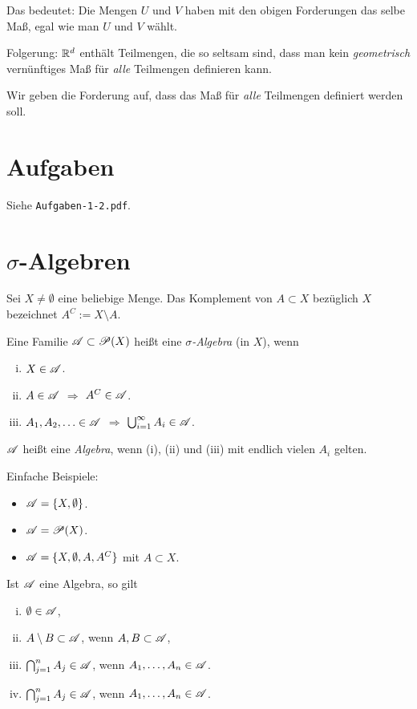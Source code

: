 Das bedeutet: Die Mengen $U$ und $V$ haben mit den obigen Forderungen das selbe Maß, egal wie man $U$ und $V$ wählt.

Folgerung: $\mathbb{R}^d$ enthält Teilmengen, die so seltsam sind, dass man kein \emph{geometrisch} vernünf\-tiges Maß für \emph{alle} Teilmengen definieren kann.

Wir geben die Forderung auf, dass das Maß für \emph{alle} Teilmengen definiert werden soll.

\section{Aufgaben}
 Siehe \verb+Aufgaben-1-2.pdf+.

\section{\texorpdfstring{$\sigma$}{Sigma}-Algebren}
Sei $X \ne \emptyset$ eine beliebige Menge. Das Komplement von $A \subset X$ bezüglich $X$ bezeichnet $A^C := X \setminus A$.

\begin{defn}
 Eine Familie $\mathscr{A} \subset \mathscr{P}(X)$ heißt eine \emph{$\sigma$-Algebra} (in $X$), wenn
 \begin{enumerate}[(i)]
  \item $X \in \mathscr{A}$.
  \item $A \in \mathscr{A}$ $\Rightarrow$ $A^C \in \mathscr{A}$.
  \item $A_1, A_2, \ldots \in \mathscr{A}$ $\Rightarrow$ $\bigcup_{i=1}^\infty A_i \in \mathscr{A}$.
 \end{enumerate}
 $\mathscr{A}$ heißt eine \emph{Algebra}, wenn (i), (ii) und (iii) mit endlich vielen $A_i$ gelten.
\end{defn}

Einfache Beispiele:
\begin{itemize}
 \item $\mathscr{A} = \{ X, \emptyset \}$.
 \item $\mathscr{A} = \mathscr{P}( X )$.
 \item $\mathscr{A} = \{ X, \emptyset, A, A^C \}$ mit $A \subset X$.
\end{itemize}

\clearpage

\begin{lem}
 Ist $\mathscr{A}$ eine Algebra, so gilt
 \begin{enumerate}[(i)]
  \item $\emptyset \in \mathscr{A}$,
  \item $A \setminus B \subset \mathscr{A}$, wenn $A,B \subset \mathscr{A}$,
  \item $\bigcap_{j=1}^n A_j \in \mathscr{A}$, wenn $A_1, \ldots, A_n \in \mathscr{A}$.
  \item $\bigcap_{j=1}^n A_j \in \mathscr{A}$, wenn $A_1, \ldots, A_n \in \mathscr{A}$.
 \end{enumerate}
\end{lem}

